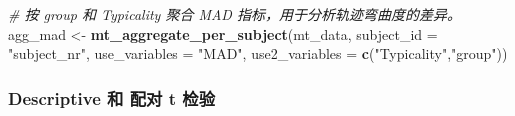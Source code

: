 \documentclass[
]{article}
\newenvironment{Shaded}{\begin{snugshade}}{\end{snugshade}}
\newcommand{\AttributeTok}[1]{\textcolor[rgb]{0.13,0.29,0.53}{#1}}
\newcommand{\CommentTok}[1]{\textcolor[rgb]{0.56,0.35,0.01}{\textit{#1}}}
\newcommand{\FunctionTok}[1]{\textcolor[rgb]{0.13,0.29,0.53}{\textbf{#1}}}
\newcommand{\NormalTok}[1]{#1}
\newcommand{\OtherTok}[1]{\textcolor[rgb]{0.56,0.35,0.01}{#1}}
\newcommand{\StringTok}[1]{\textcolor[rgb]{0.31,0.60,0.02}{#1}}
\begin{document}
\begin{Shaded}
\begin{Highlighting}[]
\CommentTok{\# 按 group 和 Typicality 聚合 MAD 指标，用于分析轨迹弯曲度的差异。}
\NormalTok{agg\_mad }\OtherTok{\textless{}{-}} \FunctionTok{mt\_aggregate\_per\_subject}\NormalTok{(mt\_data, }\AttributeTok{subject\_id =} \StringTok{"subject\_nr"}\NormalTok{,}
  \AttributeTok{use\_variables =} \StringTok{"MAD"}\NormalTok{, }\AttributeTok{use2\_variables =} \FunctionTok{c}\NormalTok{(}\StringTok{"Typicality"}\NormalTok{,}\StringTok{"group"}\NormalTok{))}
\end{Highlighting}
\end{Shaded}

\subsubsection{Descriptive 和 配对 t
检验}\label{descriptive-ux548c-ux914dux5bf9-t-ux68c0ux9a8c}
\end{document}
